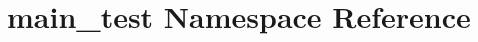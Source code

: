 \hypertarget{namespacemain__test}{}\section{main\+\_\+test Namespace Reference}
\label{namespacemain__test}
